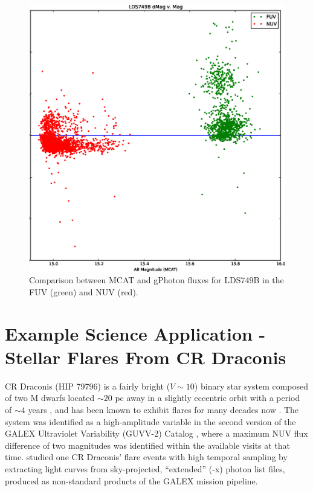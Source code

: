 \documentclass[5p]{elsarticle}
\begin{document}
\begin{figure}
\includegraphics[scale=0.35]{FigAbsPhotLDS.eps}
\caption{Comparison between MCAT and gPhoton fluxes for LDS749B in the FUV (green) and NUV (red). \label{ldsabsphot}}
\end{figure}

\section{Example Science Application - Stellar Flares From CR Draconis}
\label{scienceexamples}
CR Draconis (HIP 79796) is a fairly bright ($V \sim 10$) binary star system composed of two M dwarfs located $\sim 20$ pc away in a slightly eccentric orbit with a period of $\sim 4$ years \citep{tam2008}, and has been known to exhibit flares for many decades now \citep{cri1970}.  The system was identified as a high-amplitude variable in the second version of the GALEX Ultraviolet Variability (GUVV-2) Catalog \citep{whe2008}, where a maximum NUV flux difference of two magnitudes was identified within the available visits at that time.  \citet{wel2006} studied one CR Draconis' flare events with high temporal sampling by extracting light curves from sky-projected, ``extended'' (-x) photon list files, produced as non-standard products of the GALEX mission pipeline.
\end{document}
